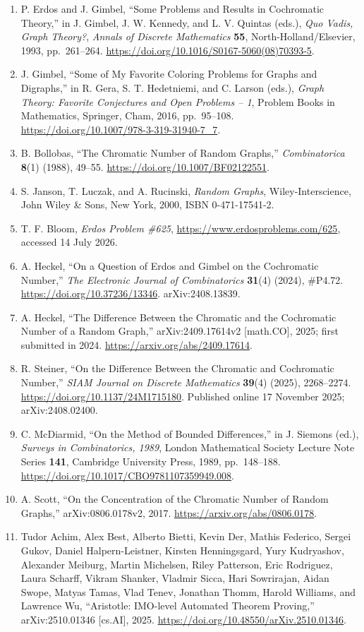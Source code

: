 \documentclass[
  11pt,
  a4paper,
]{article}
\begin{document}
\begin{enumerate}
\def\labelenumi{\arabic{enumi}.}
\item
  P. Erdos and J. Gimbel, ``Some Problems and Results in Cochromatic
  Theory,'' in J. Gimbel, J. W. Kennedy, and L. V. Quintas (eds.),
  \emph{Quo Vadis, Graph Theory?}, \emph{Annals of Discrete Mathematics}
  \textbf{55}, North-Holland/Elsevier, 1993, pp.~261--264.
  \url{https://doi.org/10.1016/S0167-5060(08)70393-5}.
\item
  J. Gimbel, ``Some of My Favorite Coloring Problems for Graphs and
  Digraphs,'' in R. Gera, S. T. Hedetniemi, and C. Larson (eds.),
  \emph{Graph Theory: Favorite Conjectures and Open Problems -- 1},
  Problem Books in Mathematics, Springer, Cham, 2016, pp.~95--108.
  \url{https://doi.org/10.1007/978-3-319-31940-7_7}.
\item
  B. Bollobas, ``The Chromatic Number of Random Graphs,''
  \emph{Combinatorica} \textbf{8}(1) (1988), 49--55.
  \url{https://doi.org/10.1007/BF02122551}.
\item
  S. Janson, T. Luczak, and A. Rucinski, \emph{Random Graphs},
  Wiley-Interscience, John Wiley \& Sons, New York, 2000, ISBN
  0-471-17541-2.
\item
  T. F. Bloom, \emph{Erdos Problem \#625},
  \url{https://www.erdosproblems.com/625}, accessed 14 July 2026.
\item
  A. Heckel, ``On a Question of Erdos and Gimbel on the Cochromatic
  Number,'' \emph{The Electronic Journal of Combinatorics}
  \textbf{31}(4) (2024), \#P4.72. \url{https://doi.org/10.37236/13346}.
  arXiv:2408.13839.
\item
  A. Heckel, ``The Difference Between the Chromatic and the Cochromatic
  Number of a Random Graph,'' arXiv:2409.17614v2 {[}math.CO{]}, 2025;
  first submitted in 2024. \url{https://arxiv.org/abs/2409.17614}.
\item
  R. Steiner, ``On the Difference Between the Chromatic and Cochromatic
  Number,'' \emph{SIAM Journal on Discrete Mathematics} \textbf{39}(4)
  (2025), 2268--2274. \url{https://doi.org/10.1137/24M1715180}.
  Published online 17 November 2025; arXiv:2408.02400.
\item
  C. McDiarmid, ``On the Method of Bounded Differences,'' in J. Siemons
  (ed.), \emph{Surveys in Combinatorics, 1989}, London Mathematical
  Society Lecture Note Series \textbf{141}, Cambridge University Press,
  1989, pp.~148--188.
  \url{https://doi.org/10.1017/CBO9781107359949.008}.
\item
  A. Scott, ``On the Concentration of the Chromatic Number of Random
  Graphs,'' arXiv:0806.0178v2, 2017.
  \url{https://arxiv.org/abs/0806.0178}.
\item
  Tudor Achim, Alex Best, Alberto Bietti, Kevin Der, Mathis Federico,
  Sergei Gukov, Daniel Halpern-Leistner, Kirsten Henningsgard, Yury
  Kudryashov, Alexander Meiburg, Martin Michelsen, Riley Patterson, Eric
  Rodriguez, Laura Scharff, Vikram Shanker, Vladmir Sicca, Hari
  Sowrirajan, Aidan Swope, Matyas Tamas, Vlad Tenev, Jonathan Thomm,
  Harold Williams, and Lawrence Wu, ``Aristotle: IMO-level Automated
  Theorem Proving,'' arXiv:2510.01346 {[}cs.AI{]}, 2025.
  \url{https://doi.org/10.48550/arXiv.2510.01346}.
\end{enumerate}
\end{document}
